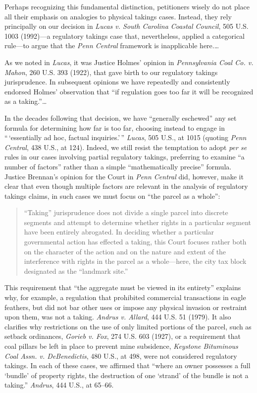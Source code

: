 Perhaps recognizing this fundamental distinction, petitioners wisely do not
place all their emphasis on analogies to physical takings cases. Instead, they
rely principally on our decision in \textit{Lucas v. South Carolina Coastal
Council}, 505 U.S. 1003 (1992)---a regulatory takings case that, nevertheless,
applied a categorical rule---to argue that the \textit{Penn Central} framework
is inapplicable here.\ldots 

As we noted in \textit{Lucas}, it was Justice Holmes' opinion in
\textit{Pennsylvania Coal Co. v. Mahon}, 260 U.S. 393 (1922), that gave birth to
our regulatory takings jurisprudence. In subsequent opinions we have repeatedly
and consistently endorsed Holmes' observation that ``if regulation goes too far
it will be recognized as a taking.''\ldots

In the decades following that decision, we have ``generally eschewed'' any set
formula for determining how far is too far, choosing instead to engage in
``\,`essentially ad hoc, factual inquiries.'\,'' \textit{Lucas}, 505 U.S., at
1015 (quoting \textit{Penn Central}, 438 U.S., at 124). Indeed, we still resist
the temptation to adopt \textit{per se} rules in our cases involving partial
regulatory takings, preferring to examine ``a number of factors'' rather than a
simple ``mathematically precise'' formula. Justice Brennan's opinion for the
Court in \textit{Penn Central} did, however, make it clear that even
though multiple factors are relevant in the analysis of regulatory takings
claims, in such cases we must focus on ``the parcel as a whole'':
\begin{quote}
``Taking'' jurisprudence does not divide a single parcel into discrete segments
and attempt to determine whether rights in a particular segment have been
entirely abrogated. In deciding whether a particular governmental action has
effected a taking, this Court focuses rather both on the character of the action
and on the nature and extent of the interference with rights in the parcel as a
whole---here, the city tax block designated as the ``landmark site.''
\end{quote}

This requirement that ``the aggregate must be viewed in its entirety'' explains
why, for example, a regulation that prohibited commercial transactions in eagle
feathers, but did not bar other uses or impose any physical invasion or
restraint upon them, was not a taking. \textit{Andrus v. Allard}, 444 U.S. 51
(1979). It also clarifies why restrictions on the use of only limited portions
of the parcel, such as setback ordinances, \textit{Gorieb v. Fox}, 274 U.S. 603
(1927), or a requirement that coal pillars be left in place to prevent mine
subsidence, \textit{Keystone Bituminous Coal Assn. v. DeBenedictis}, 480 U.S.,
at 498, were not considered regulatory takings. In each of these cases, we
affirmed that ``where an owner possesses a full `bundle' of property rights, the
destruction of one `strand' of the bundle is not a taking.'' \textit{Andrus},
444 U.S., at 65--66.

